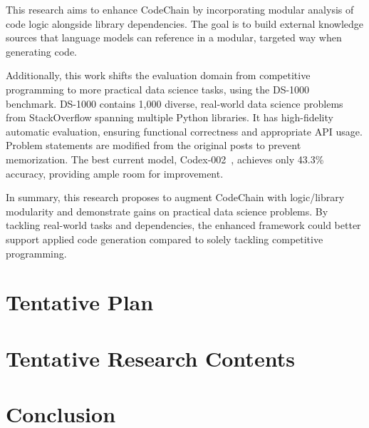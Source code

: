\documentclass[a4paper,oneside]{book}
\begin{document}
This research aims to enhance CodeChain by incorporating modular analysis of code logic alongside library dependencies. The goal is to build external knowledge sources that language models can reference in a modular, targeted way when generating code.

Additionally, this work shifts the evaluation domain from competitive programming to more practical data science tasks, using the DS-1000~\cite{pmlr-v202-lai23b} benchmark. DS-1000 contains 1,000 diverse, real-world data science problems from StackOverflow spanning multiple Python libraries. It has high-fidelity automatic evaluation, ensuring functional correctness and appropriate API usage. Problem statements are modified from the original posts to prevent memorization. The best current model, Codex-002~\cite{madaan2022language}, achieves only 43.3\% accuracy, providing ample room for improvement.

In summary, this research proposes to augment CodeChain with logic/library modularity and demonstrate gains on practical data science problems. By tackling real-world tasks and dependencies, the enhanced framework could better support applied code generation compared to solely tackling competitive programming.

\chapter{Tentative Plan}

\chapter{Tentative Research Contents}

\chapter{Conclusion}

\newpage
\renewcommand{\bibname}{References}

\end{document}
